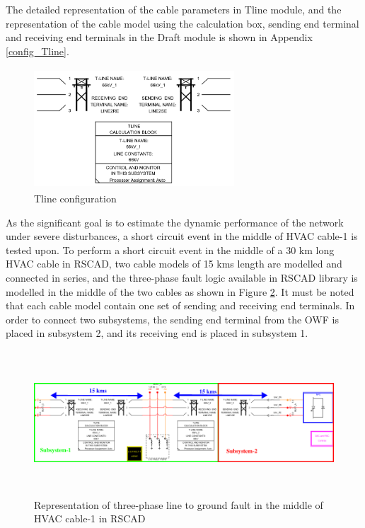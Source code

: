 The detailed representation of the cable parameters in Tline module, and the representation of the cable model using the calculation box, sending end terminal and receiving end terminals in the Draft module is shown in Appendix \ref{config_Tline}.

\begin{figure}[H]
  \centering
  \includegraphics[height = 4.5cm,width = 7.5cm]{Diagrams/Chapter_4/TlineParaBlock.PNG}  
  \caption{Tline configuration}
  \label{fig:Tline_calculationbox_RSCAD}
\end{figure}

As the significant goal is to estimate the dynamic performance of the network under severe disturbances, a short circuit event in the middle of \gls{HVAC} cable-1 is tested upon. To perform a short circuit event in the middle of a 30 km long \gls{HVAC} cable in RSCAD, two cable models of 15 kms length are modelled and connected in series, and the three-phase fault logic available in RSCAD library is modelled in the middle of the two cables as shown in Figure \ref{fig:Subsystem_Trial}. It must be noted that each cable model contain one set of sending and receiving end terminals. In order to connect two subsystems, the sending end terminal from the \gls{OWF} is placed in subsystem 2, and its receiving end is placed in subsystem 1. %

\begin{figure}[H]
\centering
    \includegraphics[height = 5.4cm,width = 17cm]{Diagrams/Chapter_4/subsystem_fault_mark.pdf}
    \caption{Representation of three-phase line to ground fault in the middle of HVAC cable-1 in RSCAD}
    \label{fig:Subsystem_Trial}
\end{figure}

